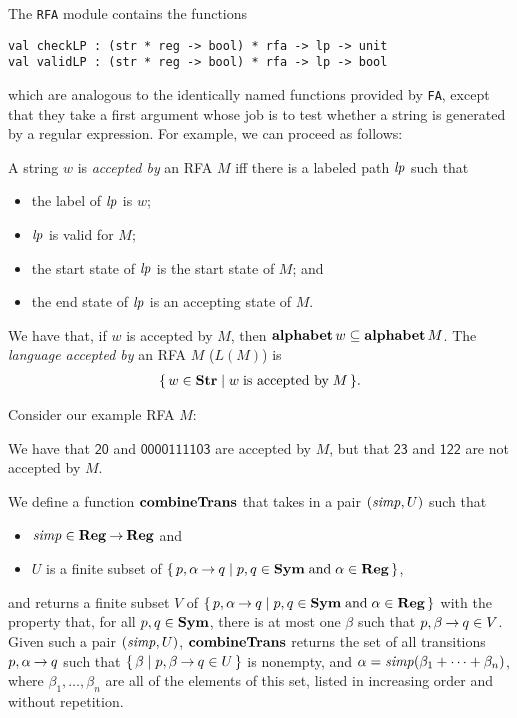 The \texttt{RFA} module contains the functions
\begin{verbatim}
val checkLP : (str * reg -> bool) * rfa -> lp -> unit
val validLP : (str * reg -> bool) * rfa -> lp -> bool
\end{verbatim}
which are analogous to the identically named functions provided by
\texttt{FA}, except that they take a first argument whose job is
to test whether a string is generated by a regular expression.
For example, we can proceed as follows:


A string $w$ is \emph{accepted by} an RFA $M$ iff
there is a labeled path ${\it lp}$ such that
\begin{itemize}
\item the label of ${\it lp}$ is $w$;

\item ${\it lp}$ is valid for $M$;

\item the start state of ${\it lp}$ is the start state of $M$; and

\item the end state of ${\it lp}$ is an accepting state of $M$.
\end{itemize}
We have that, if $w$ is accepted by $M$, then
$\mathbf{alphabet}\,w\subseteq\mathbf{alphabet}\,M$.  The \emph{language accepted by} an
RFA $M$ ($L(M)$) is
\begin{gather*}
\{ \, w\in\mathbf{Str} \mid w\;\allowbreak\mbox{is accepted by}\allowbreak\;M \, \}.
\end{gather*}

Consider our example RFA $M$:
\begin{center}

\end{center}
We have that $\mathsf{20}$ and $\mathsf{0000111103}$ are
accepted by $M$, but that $\mathsf{23}$ and $\mathsf{122}$ are
not accepted by $M$.

We define a function $\mathbf{combineTrans}$ that takes in a pair $({\it simp}, U)$
such that
\begin{itemize}
\item ${\it simp}\in\mathbf{Reg}\mathbin{\to}\mathbf{Reg}$ and

\item $U$ is a finite subset of
  $\{ \, p,\alpha\mathbin{\to} q \mid p,q\in\mathbf{Sym}\;\allowbreak\mbox{and}\allowbreak\;\alpha\in\mathbf{Reg} \, \}$,
\end{itemize}
and returns a finite subset $V$ of $\{ \, p,\alpha\mathbin{\to}
  q \mid p,q\in\mathbf{Sym}\;\allowbreak\mbox{and}\allowbreak\;\alpha\in\mathbf{Reg} \, \}$ with the property that, for
all $p,q\in\mathbf{Sym}$, there is at most one $\beta$ such that $p,\beta\mathbin{\to}
q\in V$.
Given such a pair $({\it simp}, U)$, $\mathbf{combineTrans}$ returns the set of all
transitions $p,\alpha\mathbin{\to} q$ such that $\{ \, \beta \mid p,\beta\mathbin{\to} q\in U \, \}$
is nonempty, and $\alpha = {\it simp}(\beta_1+\cdots+\beta_n)$,
where $\beta_1,\ldots,\beta_n$ are all of the elements of this set,
listed in increasing order and without repetition.


